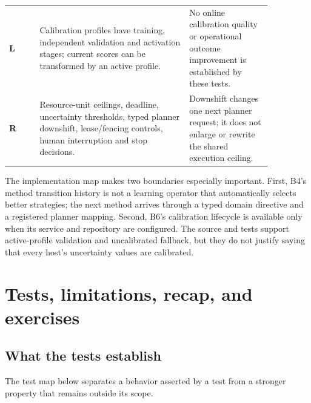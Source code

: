 \begin{longtable}{@{}>{\raggedright\arraybackslash}p{0.10\linewidth} >{\raggedright\arraybackslash}p{0.49\linewidth} >{\raggedright\arraybackslash}p{0.27\linewidth}@{}}
\textbf{L} & Calibration profiles have training, independent validation and activation stages; current scores can be transformed by an active profile. & No online calibration quality or operational outcome improvement is established by these tests. \\
\textbf{R} & Resource-unit ceilings, deadline, uncertainty thresholds, typed planner downshift, lease/fencing controls, human interruption and stop decisions. & Downshift changes one next planner request; it does not enlarge or rewrite the shared execution ceiling. \\
\bottomrule
\end{longtable}

The implementation map makes two boundaries especially important. First, B4's method transition history is not a learning operator that automatically selects better strategies; the next method arrives through a typed domain directive and a registered planner mapping. Second, B6's calibration lifecycle is available only when its service and repository are configured. The source and tests support active-profile validation and uncalibrated fallback, but they do not justify saying that every host's uncertainty values are calibrated.

\section{Tests, limitations, recap, and exercises}
\label{sec:ch23-tests-recap}

\subsection{What the tests establish}
\label{subsec:ch23-test-map}

The test map below separates a behavior asserted by a test from a stronger property that remains outside its scope.

